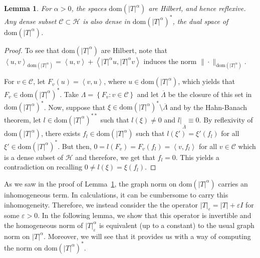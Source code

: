 \documentclass[a4paper,10pt,reqno]{amsart}
\newcommand{\rest}[1]{{{\lvert_{}}_{}}_{#1}}
\newcommand{\dbrac}[1]{\left\{#1\right\}}
\newcommand{\modulus}[1]{|#1|}
\newcommand{\norm}[1]{\| #1 \|}%
\newcommand{\set}[1]{\dbrac{#1}}
\newcommand{\Hil}{\mathscr{H}}
\newcommand{\core}{\mathscr{C}}
\newcommand{\dom}{\mathrm{dom}}
\newcommand{\close}[1]{\overline{#1}}
\newcommand{\inprod}[1]{\left\langle #1 \right\rangle}%
\renewcommand{\epsilon}{\varepsilon}
\newtheorem{lemma}[theorem]{Lemma}
\theoremstyle{definition}
\begin{document}
\begin{lemma}
\label{Lem:Frac0}
For $\alpha > 0$, the spaces $\dom(\modulus{T}^\alpha)$ are Hilbert, and hence reflexive.
Any dense subset $\core \subset \Hil$ is also dense in $\dom(\modulus{T}^\alpha)^\ast$, the dual space of $\dom(\modulus{T}^\alpha)$.
\end{lemma}
\begin{proof}
To see that $\dom(\modulus{T}^\alpha)$ are Hilbert, note that $\inprod{u,v}_{ \dom(\modulus{T}^\alpha)} = \inprod{u,v} + \inprod{ \modulus{T}^\alpha u, \modulus{T}^\alpha v}$ induces the norm $\norm{\cdot}_{\dom(\modulus{T}^\alpha)}$.

For $v \in \core$, let $F_v(u) = \inprod{v, u}$, where $u \in \dom(\modulus{T}^\alpha)$, which yields that $F_v \in \dom(\modulus{T}^\alpha)^\ast$.
Take $\Lambda = \set{F_v: v \in \core}$ and  let $\close{\Lambda}$ be the closure of this set in $\dom(\modulus{T}^\alpha)^\ast$.
Now, suppose that $\xi \in \dom(\modulus{T}^\alpha)^\ast \setminus \close{\Lambda}$ and by the Hahn-Banach theorem, let $l \in \dom(\modulus{T}^\alpha)^{\ast\ast}$ such that $l(\xi) \neq 0$ and $l\rest{\close{\Lambda}} \equiv 0$.
By reflexivity of $\dom(\modulus{T}^\alpha)$, there exists $f_l \in \dom(\modulus{T}^\alpha)$ such that $l(\xi') = \xi'(f_l)$ for all $\xi' \in \dom(\modulus{T}^\alpha)^\ast$.
But then, $0 = l(F_v) = F_v(f_l) = \inprod{v, f_l}$ for all $v \in \core$ which is a dense subset of $\Hil$ and therefore, we get that $f_l = 0$.
This yields a contradiction on recalling $0 \neq l(\xi) = \xi(f_l)$.
\end{proof}

As we saw in the proof of Lemma~\ref{Lem:Frac0}, the graph norm on $\dom(\modulus{T}^\alpha)$ carries an inhomogeneous term.
In calculations, it can be cumbersome to carry this inhomogeneity.
Therefore, we instead consider the the operator $\modulus{T}_\epsilon = \modulus{T} + \epsilon I$ for some $\epsilon > 0$.
In the following lemma, we show that this operator is invertible and the homogeneous norm of $\modulus{T}_\epsilon^\alpha$ is equivalent (up to a constant)  to the usual graph norm on $\modulus{T}^\alpha$.
Moreover, we will see that it provides us with a way of computing the norm on $\dom(\modulus{T}^\alpha)^\ast$.
\end{document}
